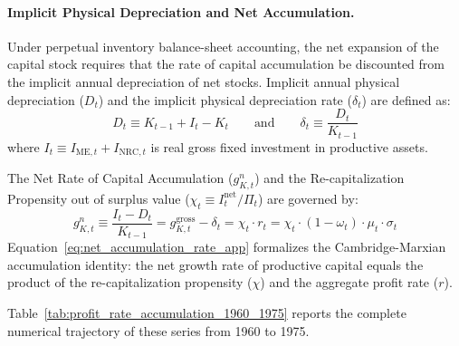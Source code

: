 \paragraph{Implicit Physical Depreciation and Net Accumulation.}
Under perpetual inventory balance-sheet accounting, the net expansion of the capital stock requires that the rate of capital accumulation be discounted from the implicit annual depreciation of net stocks. Implicit annual physical depreciation ($D_t$) and the implicit physical depreciation rate ($\delta_t$) are defined as:
\begin{equation}
	D_t \equiv K_{t-1} + I_t - K_t \qquad \text{and} \qquad \delta_t \equiv \frac{D_t}{K_{t-1}}
	\label{eq:implicit_depreciation_app}
\end{equation}
where $I_t \equiv I_{\text{ME}, t} + I_{\text{NRC}, t}$ is real gross fixed investment in productive assets. 

The Net Rate of Capital Accumulation ($g^n_{K, t}$) and the Re-capitalization Propensity out of surplus value ($\chi_t \equiv I^{\text{net}}_t / \Pi_t$) are governed by:
\begin{equation}
	g^n_{K, t} \equiv \frac{I_t - D_t}{K_{t-1}} = g^{\text{gross}}_{K, t} - \delta_t = \chi_t \cdot r_t = \chi_t \cdot (1 - \omega_t) \cdot \mu_t \cdot \sigma_t
	\label{eq:net_accumulation_rate_app}
\end{equation}
Equation~\eqref{eq:net_accumulation_rate_app} formalizes the Cambridge-Marxian accumulation identity: the net growth rate of productive capital equals the product of the re-capitalization propensity ($\chi$) and the aggregate profit rate ($r$).

Table~\ref{tab:profit_rate_accumulation_1960_1975} reports the complete numerical trajectory of these series from 1960 to 1975.


